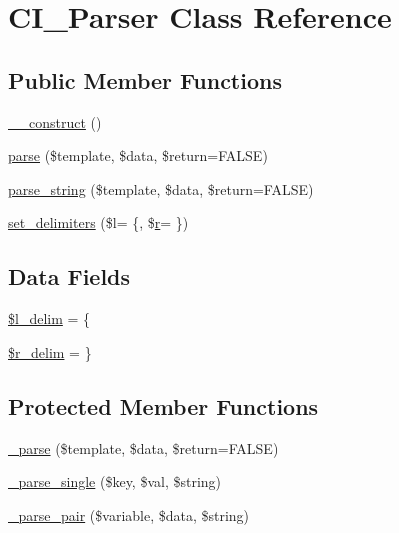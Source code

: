 \hypertarget{class_c_i___parser}{}\section{C\+I\+\_\+\+Parser Class Reference}
\label{class_c_i___parser}
\subsection*{Public Member Functions}
\begin{DoxyCompactItemize}
\item 
\hyperlink{class_c_i___parser_a095c5d389db211932136b53f25f39685}{\+\_\+\+\_\+construct} ()
\item 
\hyperlink{class_c_i___parser_aed3a838a4afdff95c4bf2b1fb5062cbd}{parse} (\$template, \$data, \$return=F\+A\+L\+S\+E)
\item 
\hyperlink{class_c_i___parser_a5cdfa809d6f2988d2741cb26b5a51d36}{parse\+\_\+string} (\$template, \$data, \$return=F\+A\+L\+S\+E)
\item 
\hyperlink{class_c_i___parser_a1865a64fc2d5187c9898abd7239a565b}{set\+\_\+delimiters} (\$l= \textquotesingle{}\{\textquotesingle{}, \$\hyperlink{jquery-1_811_82_8min_8js_a96f65b399314d93896076ceb474b6b9b}{r}= \textquotesingle{}\}\textquotesingle{})
\end{DoxyCompactItemize}
\subsection*{Data Fields}
\begin{DoxyCompactItemize}
\item 
\hyperlink{class_c_i___parser_ab957da01a735e612795fba1c5802b1fb}{\$l\+\_\+delim} = \textquotesingle{}\{\textquotesingle{}
\item 
\hyperlink{class_c_i___parser_a4d80dc6a622989846dbd0e39fde0f3bb}{\$r\+\_\+delim} = \textquotesingle{}\}\textquotesingle{}
\end{DoxyCompactItemize}
\subsection*{Protected Member Functions}
\begin{DoxyCompactItemize}
\item 
\hyperlink{class_c_i___parser_a6bd5ad826db82a61de1f3a13031faaf9}{\+\_\+parse} (\$template, \$data, \$return=F\+A\+L\+S\+E)
\item 
\hyperlink{class_c_i___parser_a01c9bb8a5e8802a1b21acf829cc181e7}{\+\_\+parse\+\_\+single} (\$key, \$val, \$string)
\item 
\hyperlink{class_c_i___parser_a3f01fef88e49c40d679e35dedf89a128}{\+\_\+parse\+\_\+pair} (\$variable, \$data, \$string)
\end{DoxyCompactItemize}
